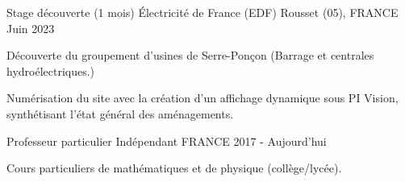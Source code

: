 

\begin{cventries}

  \cventry
    {Stage découverte (1 mois)} %
    {Électricité de France (EDF)} %
    {Rousset (05), FRANCE} %
    {Juin 2023} %
    {
      \begin{cvitems} %
        \item{Découverte du groupement d'usines de Serre-Ponçon (Barrage et centrales hydroélectriques.)}
        \item{Numérisation du site avec la création d'un affichage dynamique sous PI Vision, synthétisant l'état général des aménagements.}
      \end{cvitems}
    }
\cventry
  {Professeur particulier} %
  {Indépendant} %
  {FRANCE} %
  {2017 - Aujourd'hui} %
  {
    \begin{cvitems} %
      \item{Cours particuliers de mathématiques et de physique (collège/lycée).}
    \end{cvitems}
  }

\end{cventries}
